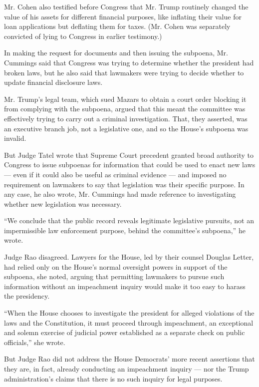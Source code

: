 Mr. Cohen also testified before Congress that Mr. Trump routinely
changed the value of his assets for different financial purposes, like
inflating their value for loan applications but deflating them for
taxes. (Mr. Cohen was separately convicted of lying to Congress in
earlier testimony.)

In making the request for documents and then issuing the subpoena, Mr.
Cummings said that Congress was trying to determine whether the
president had broken laws, but he also said that lawmakers were trying
to decide whether to update financial disclosure laws.

Mr. Trump's legal team, which sued Mazars to obtain a court order
blocking it from complying with the subpoena, argued that this meant the
committee was effectively trying to carry out a criminal investigation.
That, they asserted, was an executive branch job, not a legislative one,
and so the House's subpoena was invalid.

But Judge Tatel wrote that Supreme Court precedent granted broad
authority to Congress to issue subpoenas for information that could be
used to enact new laws --- even if it could also be useful as criminal
evidence --- and imposed no requirement on lawmakers to say that
legislation was their specific purpose. In any case, he also wrote, Mr.
Cummings had made reference to investigating whether new legislation was
necessary.

``We conclude that the public record reveals legitimate legislative
pursuits, not an impermissible law enforcement purpose, behind the
committee's subpoena,'' he wrote.

Judge Rao disagreed. Lawyers for the House, led by their counsel Douglas
Letter, had relied only on the House's normal oversight powers in
support of the subpoena, she noted, arguing that permitting lawmakers to
pursue such information without an impeachment inquiry would make it too
easy to harass the presidency.

``When the House chooses to investigate the president for alleged
violations of the laws and the Constitution, it must proceed through
impeachment, an exceptional and solemn exercise of judicial power
established as a separate check on public officials,'' she wrote.

But Judge Rao did not address the House Democrats' more recent
assertions that they are, in fact, already conducting an impeachment
inquiry --- nor the Trump administration's claims that there is no such
inquiry for legal purposes.

